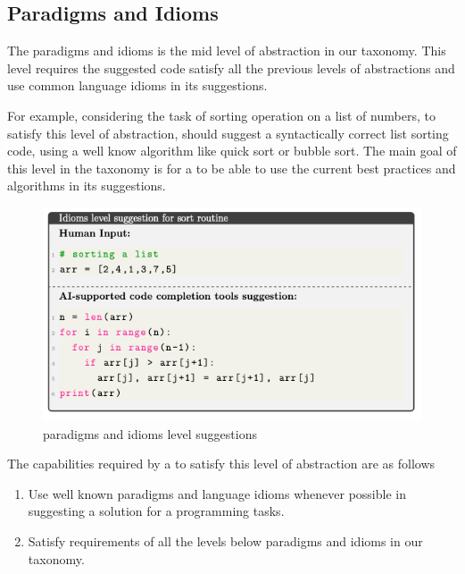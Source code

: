 \subsection{Paradigms and Idioms}
The paradigms and idioms is the mid level of abstraction in our taxonomy. This level requires the suggested code satisfy all the previous levels of abstractions and use common language idioms in its suggestions. 

For example, considering the task of sorting operation on a list of numbers, to satisfy this level of abstraction, \cct{} should suggest a syntactically correct list sorting code, using a well know algorithm like quick sort or bubble sort. The main goal of this level in the taxonomy is for a \cct{} to be able to use the current best practices and algorithms in its suggestions.

\begin{figure}[hbt!]
    \centering
    \includegraphics[width=\linewidth]{Figures/idioms.png}
    \caption{\cct{} paradigms and idioms level suggestions}
    \label{fig:idioms}
\end{figure}

The capabilities required by a \cct{} to satisfy this level of abstraction are as follows
\begin{enumerate}
    \item Use well known paradigms and language idioms whenever possible in suggesting a solution for a programming tasks.
    \item Satisfy requirements of all the levels below paradigms and idioms in our taxonomy.
\end{enumerate}

